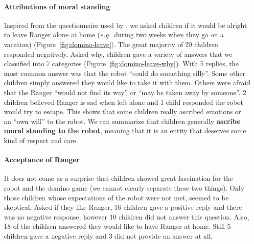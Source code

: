 \documentclass{sig-alternate}
\newcommand{\eg}{{\textit{e.g.~}}}
\begin{document}
\paragraph{Attributions of moral standing}

Inspired from the questionnaire used by \cite{kahn_jr._robotic_2006}, we asked
children if it would be alright to leave Ranger alone at home (\eg during two
weeks when they go on a vacation) (Figure~\ref{fig:domino-leave}). The great
majority of 20 children responded negatively. Asked why, children gave a variety
of answers that we classified into 7 categories
(Figure~\ref{fig:domino-leave-why}). With 5 replies, the most common answer was
that the robot ``could do something silly''. Some other children simply answered
they would like to take it with them. Others were afraid that the Ranger ``would
not find its way'' or ``may be taken away by someone''. 2 children believed
Ranger is sad when left alone and 1 child responded the robot would try to
escape. This shows that some children really ascribed emotions or an ``own
will'' to the robot.  We can summarize that children generally \textbf{ascribe
moral standing to the robot}, meaning that it is an entity that deserves some
kind of respect and care. 
	
	
\paragraph{Acceptance of Ranger}

It does not come as a surprise that children showed great fascination for the
robot and the domino game (we cannot clearly separate these two things). Only
those children whose expectations of the robot were not met, seemed to be
skeptical. Asked if they like Ranger, 16 children gave a positive reply and
there was no negative response, however 10 children did not answer this
question. Also, 18 of the children answered they would like to have Ranger at
home. Still 5 children gave a negative reply and 3 did not provide an answer at
all. 
\end{document}
